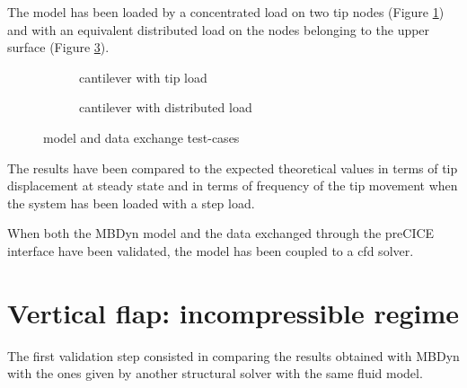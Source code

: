 The model has been loaded by a concentrated load on two tip nodes (Figure \ref{fig:cnt-tip}) and with an equivalent distributed load on the nodes belonging to the upper surface (Figure \ref{fig:cnt-distrib}).

\begin{figure}[htbp!]
	    \begin{subfigure}{.8\textwidth}
	    \centering
    	\caption{cantilever with tip load}
		\label{fig:cnt-tip}
	    \end{subfigure}
	    \par\bigskip
	    \begin{subfigure}{.8\textwidth}
		\centering
    	\caption{cantilever with distributed load}
		\label{fig:cnt-distrib}
	    \end{subfigure}
	\caption{model and data exchange test-cases}
\end{figure}

The results have been compared to the expected theoretical values in terms of tip displacement at steady state and in terms of frequency of the tip movement when the system has been loaded with a step load.

When both the MBDyn model and the data exchanged through the preCICE interface have been validated, the model has been coupled to a \acrshort{cfd} solver.





\section{Vertical flap: incompressible regime}
\label{sec:cx-mbd}

The first validation step consisted in comparing the results obtained with MBDyn with the ones given by another structural solver with the same fluid model. 

